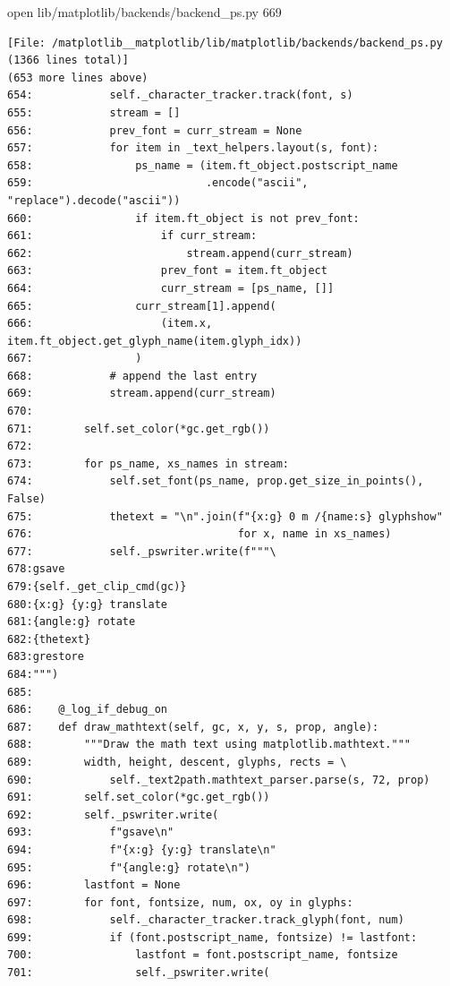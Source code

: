 {\begin{agentbox}
\hrulefill
\begin{CodeVerbatim}[breaklines=true, breakanywhere=true]
open lib/matplotlib/backends/backend_ps.py 669
\end{CodeVerbatim}
\end{agentbox}
\begin{observationbox}\begin{Verbatim}[breaklines=true, breakanywhere=true]
[File: /matplotlib__matplotlib/lib/matplotlib/backends/backend_ps.py (1366 lines total)]
(653 more lines above)
654:            self._character_tracker.track(font, s)
655:            stream = []
656:            prev_font = curr_stream = None
657:            for item in _text_helpers.layout(s, font):
658:                ps_name = (item.ft_object.postscript_name
659:                           .encode("ascii", "replace").decode("ascii"))
660:                if item.ft_object is not prev_font:
661:                    if curr_stream:
662:                        stream.append(curr_stream)
663:                    prev_font = item.ft_object
664:                    curr_stream = [ps_name, []]
665:                curr_stream[1].append(
666:                    (item.x, item.ft_object.get_glyph_name(item.glyph_idx))
667:                )
668:            # append the last entry
669:            stream.append(curr_stream)
670:
671:        self.set_color(*gc.get_rgb())
672:
673:        for ps_name, xs_names in stream:
674:            self.set_font(ps_name, prop.get_size_in_points(), False)
675:            thetext = "\n".join(f"{x:g} 0 m /{name:s} glyphshow"
676:                                for x, name in xs_names)
677:            self._pswriter.write(f"""\
678:gsave
679:{self._get_clip_cmd(gc)}
680:{x:g} {y:g} translate
681:{angle:g} rotate
682:{thetext}
683:grestore
684:""")
685:
686:    @_log_if_debug_on
687:    def draw_mathtext(self, gc, x, y, s, prop, angle):
688:        """Draw the math text using matplotlib.mathtext."""
689:        width, height, descent, glyphs, rects = \
690:            self._text2path.mathtext_parser.parse(s, 72, prop)
691:        self.set_color(*gc.get_rgb())
692:        self._pswriter.write(
693:            f"gsave\n"
694:            f"{x:g} {y:g} translate\n"
695:            f"{angle:g} rotate\n")
696:        lastfont = None
697:        for font, fontsize, num, ox, oy in glyphs:
698:            self._character_tracker.track_glyph(font, num)
699:            if (font.postscript_name, fontsize) != lastfont:
700:                lastfont = font.postscript_name, fontsize
701:                self._pswriter.write(

\end{Verbatim}
\end{observationbox}}
